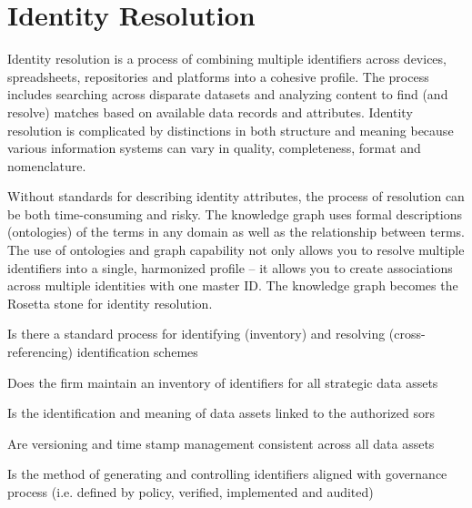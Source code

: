 \section{Identity Resolution}\label{sec:ekgmm-b-2-1} %

Identity resolution is a process of combining multiple identifiers across devices, spreadsheets, repositories and
platforms into a cohesive profile.
The process includes searching across disparate datasets and analyzing content to find (and resolve) matches based
on available data records and attributes.
Identity resolution is complicated by distinctions in both structure and meaning because various information systems
can vary in quality, completeness, format and nomenclature.

\kgmmekgrationalesection

Without standards for describing identity attributes, the process of resolution can be both time-consuming and risky.
The knowledge graph uses formal descriptions (ontologies) of the terms in any domain as well as the relationship
between terms.
The use of ontologies and graph capability not only allows you to resolve multiple identifiers into a single,
harmonized profile -- it allows you to create associations across multiple identities with one master ID.
The knowledge graph becomes the Rosetta stone for identity resolution.

\kgmmcorequestionssection

\begin{core-questions}

  \item [\thesection.1] Is there a standard process for identifying (inventory) and resolving (cross-referencing)
                        identification schemes
  \item [\thesection.2] Does the firm maintain an inventory of identifiers for all strategic data assets
  \item [\thesection.3] Is the identification and meaning of data assets linked to the authorized \glspl{sor}
  \item [\thesection.4] Are versioning and time stamp management consistent across all data assets
  \item [\thesection.5] Is the method of generating and controlling identifiers aligned with governance process
                        (i.e. defined by policy, verified, implemented and audited)

\end{core-questions}

